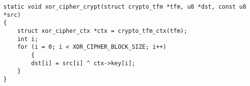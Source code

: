 \begin{verbatim}
static void xor_cipher_crypt(struct crypto_tfm *tfm, u8 *dst, const u8 *src)
{
    struct xor_cipher_ctx *ctx = crypto_tfm_ctx(tfm);
    int i;
    for (i = 0; i < XOR_CIPHER_BLOCK_SIZE; i++)
        {
        dst[i] = src[i] ^ ctx->key[i];
    }
}
\end{verbatim}
